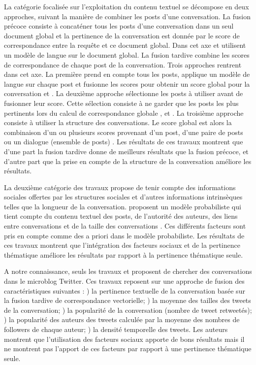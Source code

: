 \documentclass{article-hermes}
\begin{document}
\par La catégorie focalisée sur l'exploitation du contenu textuel se décompose en deux approches, suivant la manière de combiner les posts d'une conversation. La fusion précoce consiste à concaténer tous les posts d'une conversation dans un seul document global et la pertinence de la conversation est donnée par le score de correspondance entre la requête  et ce document global. Dans cet axe \cite{seo2009} et \cite{elsas9} utilisent un modèle de langue sur le document global. La fusion tardive combine les scores de correspondance de chaque post de la conversation. Trois approches rentrent dans cet axe.
La première prend en compte tous les posts, applique un modèle de langue sur chaque post et fusionne les scores pour obtenir un score global pour la conversation \cite{seo2009} et \cite{elsas9}. 
La deuxième approche sélectionne les posts à utiliser avant de fusionner leur score. Cette sélection consiste à ne garder que les posts les plus pertinents lors du calcul de correspondance globale \cite{seo2009}, \cite{elsas9} et \cite{voting}.
La troisième approche consiste à utiliser la structure des conversations. Le score global est alors la combinaison d'un ou plusieurs scores provenant d'un post, d'une paire de posts ou un dialogue (ensemble de posts) \cite{seo2009}. Les résultats de ces travaux montrent que d'une part la fusion tardive donne de meilleurs résultats que la fusion précoce, et d'autre part que la prise en compte de la structure de la conversation améliore les résultats.


\par La deuxième catégorie des travaux propose de tenir compte des informations sociales offertes par les structures sociales et d'autres informations intrinsèques telles que la longueur de la conversation. \cite{Inference} proposent un modèle probabiliste qui tient compte du contenu textuel des posts, de l'autorité des auteurs, des liens entre conversations et de la taille des conversations \cite{Inference} . Ces différents facteurs sont pris en compte comme des a priori dans le modèle probabiliste. Les résultats de ces travaux montrent que l'intégration des facteurs sociaux et de la pertinence thématique améliore les résultats par rapport à la pertinence thématique seule. 

\par A notre connaissance, seuls les travaux \cite{magnani1} et \cite{magnani2} proposent de chercher des conversations dans le microblog Twitter. Ces travaux reposent sur une approche de fusion des caractéristiques suivantes :  ) la pertinence textuelle de la conversation basée sur la fusion tardive de correspondance vectorielle; ) la moyenne des tailles des tweets de la conversation; ) la popularité de la conversation (nombre de tweet retweetés); ) la popularité des auteurs des tweets calculée par la moyenne des nombres de followers de chaque auteur; ) la densité temporelle des tweets. Les auteurs montrent que l'utilisation des facteurs sociaux apporte de bons résultats mais il ne montrent pas l'apport de ces facteurs par rapport à une pertinence thématique seule. 
\end{document}
